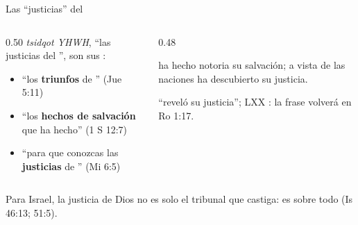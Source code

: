 \begin{frame}{Las ``justicias'' del \SENOR}
\begin{columns}[c,onlytextwidth]
\begin{column}{0.50\textwidth}\small
{} \emph{tsidqot YHWH}, ``las justicias del \SENOR'', son sus :
\begin{itemize}
\item ``los \textbf{triunfos} de \SENOR'' (Jue 5:11)
\item ``los \textbf{hechos de salvación} que \SENOR{} ha hecho'' (1 S 12:7)
\item ``para que conozcas las \textbf{justicias} de \SENOR'' (Mi 6:5)
\end{itemize}
\end{column}
\begin{column}{0.48\textwidth}
\begin{cita}\SENOR{} ha hecho notoria su salvación; a vista de las naciones ha descubierto su justicia.\end{cita}
\scriptsize{} ``reveló su justicia''; LXX : la frase volverá en Ro 1:17.
\end{column}
\end{columns}\par\medskip
\small Para Israel, la justicia de Dios no es solo el tribunal que castiga: es sobre todo  (Is 46:13; 51:5).
\end{frame}


